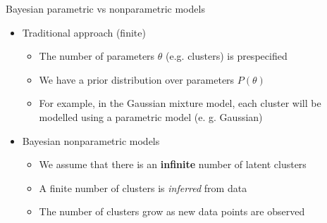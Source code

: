 \documentclass[xcolor={x11names,svgnames,dvipsnames},trans]{beamer}
\begin{document}
\begin{frame}{Bayesian parametric vs nonparametric models}
    \begin{itemize}
        \item Traditional approach (finite)
           \begin{itemize}
               \item The number of parameters $\theta$ (e.g. clusters) is prespecified
               \item We have a prior distribution over parameters $P(\theta)$
               \item For example, in the Gaussian mixture model, each cluster will be modelled
                   using a parametric model (e. g. Gaussian)
           \end{itemize}
        \item Bayesian nonparametric models
           \begin{itemize}
               \item We assume that there is an \textbf{infinite} number of latent clusters
               \item A finite number of clusters is \textit{inferred} from data
               \item The number of clusters grow as new data points are observed
           \end{itemize}
    \end{itemize}

\end{frame}
\end{document}
